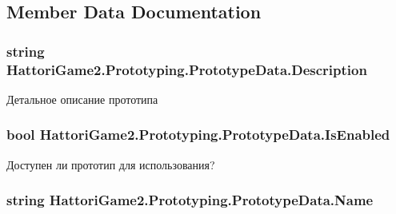 \subsection{Member Data Documentation}
\hypertarget{class_hattori_game2_1_1_prototyping_1_1_prototype_data_a8c0f6d49d474ae24964f25064fa90d5d_a8c0f6d49d474ae24964f25064fa90d5d}{}
\subsubsection[{Description}]{\setlength{\rightskip}{0pt plus 5cm}string Hattori\+Game2.\+Prototyping.\+Prototype\+Data.\+Description}\label{class_hattori_game2_1_1_prototyping_1_1_prototype_data_a8c0f6d49d474ae24964f25064fa90d5d_a8c0f6d49d474ae24964f25064fa90d5d}


Детальное описание прототипа 

\hypertarget{class_hattori_game2_1_1_prototyping_1_1_prototype_data_a84c70c2b7ccac5ccb9ec1ba50084f9fb_a84c70c2b7ccac5ccb9ec1ba50084f9fb}{}
\subsubsection[{Is\+Enabled}]{\setlength{\rightskip}{0pt plus 5cm}bool Hattori\+Game2.\+Prototyping.\+Prototype\+Data.\+Is\+Enabled}\label{class_hattori_game2_1_1_prototyping_1_1_prototype_data_a84c70c2b7ccac5ccb9ec1ba50084f9fb_a84c70c2b7ccac5ccb9ec1ba50084f9fb}


Доступен ли прототип для использования? 

\hypertarget{class_hattori_game2_1_1_prototyping_1_1_prototype_data_a516003b06d0fc45830021db7de22068a_a516003b06d0fc45830021db7de22068a}{}
\subsubsection[{Name}]{\setlength{\rightskip}{0pt plus 5cm}string Hattori\+Game2.\+Prototyping.\+Prototype\+Data.\+Name}\label{class_hattori_game2_1_1_prototyping_1_1_prototype_data_a516003b06d0fc45830021db7de22068a_a516003b06d0fc45830021db7de22068a}


